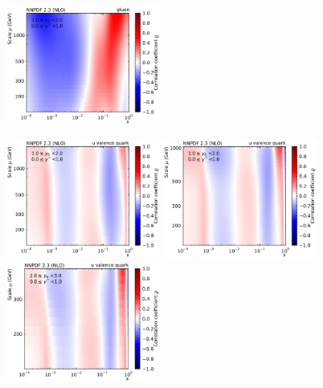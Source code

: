 \begin{figure}[htbp]
    \includegraphics[width=0.45\textwidth]{figures/pdf_constraints/corr_PTMAXEXPYS_YBYS_NLO_FINALBINS_NNPDF23_gluon_ys0_0yb0_0_cl.pdf}\hfill
    \caption{}
    \label{fig:pdfconstraints_gluon}
\end{figure}

\begin{figure}[htbp]
    \centering
    \includegraphics[width=0.45\textwidth]{figures/pdf_constraints/corr_PTMAXEXPYS_YBYS_NLO_FINALBINS_NNPDF23_u_valence_quark_ys0_0yb0_0_cl.pdf}\hfill
    \includegraphics[width=0.45\textwidth]{figures/pdf_constraints/corr_PTMAXEXPYS_YBYS_NLO_FINALBINS_NNPDF23_u_valence_quark_ys0_0yb1_0_cl.pdf}\hfill
    \includegraphics[width=0.45\textwidth]{figures/pdf_constraints/corr_PTMAXEXPYS_YBYS_NLO_FINALBINS_NNPDF23_u_valence_quark_ys0_0yb2_0_cl.pdf}\hfill

\end{figure}

